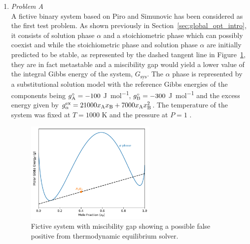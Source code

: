 	\begin{enumerate}
	\item	\emph{Problem A}\\
		A fictive binary   system based on Piro and Simunovic \cite{Piro16} has been considered as the first test problem. As shown previously in Section~\ref{sec:global_opt_intro}, it consists of solution phase $\alpha$ and a stoichiometric phase  which can possibly coexist and while the stoichiometric phase  and solution phase $\alpha$ are initially predicted to be stable, as represented by the dashed tangent line in Figure~\ref{fig:testA}, they are in fact metastable and a miscibility gap would yield a lower value of the integral Gibbs energy of the system, $G_\text{sys}$. The $\alpha$ phase is represented by a substitutional solution model with the reference Gibbs energies of the components being $g_{\ce{A}}^\circ = -100 $ \si{\joule \per \mole}, $g_{\ce{B}}^\circ = -300$ \si{\joule \per \mole} and the excess energy given by $g_{\alpha}^\text{ex} = 21000 x_{\ce{A}} x_{\ce{B}} + 7000 x_{\ce{A}} x_{\ce{B}}^2$. The temperature of the system was fixed at $T = 1000$ \si{\kelvin} and the pressure at $P=1$ \si{\atmosphere}.
		\begin{figure}[htbp]			
			\centering
			\includegraphics[width=0.6\textwidth]{figures/chapter-6/System_AB.pdf}
			\caption[Global optimisation test problem A: Fictive system with miscibility gap showing a possible false positive from thermodynamic equilibrium solver.]{Fictive system with miscibility gap showing a possible false positive from thermodynamic equilibrium solver.}
			\label{fig:testA}
		\end{figure}
 

\end{enumerate}
